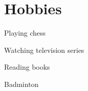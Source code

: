 \documentclass[a4paper]{srika-resume} %
\begin{document}
\begin{minipage}[t]{0.35\textwidth}
\sectionspace %


\section{Hobbies} 
\begin{tightitemizespaced}
\item Playing chess
\item Watching television series
\item Reading books
\item Badminton
\end{tightitemizespaced}

\sectionspace %


\end{minipage} %
\hfill
%
%
\end{document}
